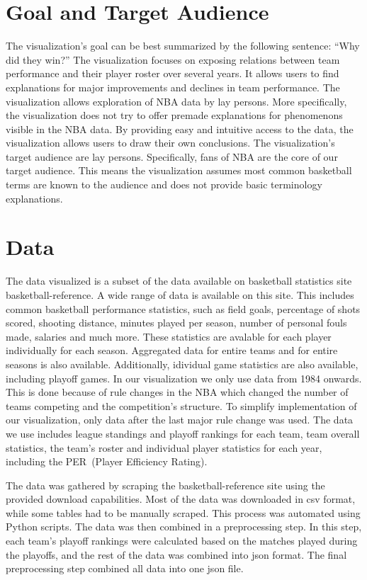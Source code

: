 \documentclass{sigchi}
\begin{document}
\section{Goal and Target Audience}\label{sec:goal} 
The visualization's goal can be best summarized by the following sentence: ``Why
did they win?'' The visualization focuses on exposing relations between team
performance and their player roster over several years. It allows users to find
explanations for major improvements and declines in team performance.  The
visualization allows exploration of NBA data by lay persons.  More specifically,
the visualization does not try to offer premade explanations for phenomenons
visible in the NBA data. By providing easy and intuitive access to the data, the
visualization allows users to draw their own conclusions. The visualization's
target audience are lay persons. Specifically, fans of NBA are the core of our
target audience. This means the visualization assumes most common basketball
terms are known to the audience and does not provide basic terminology
explanations. 

\section{Data}\label{sec:data}
The data visualized is a subset of the data available on basketball statistics
site basketball-reference\cite{basketball-reference}. A wide range of data is
available on this site. This includes common basketball performance statistics,
such as field goals, percentage of shots scored, shooting distance, minutes
played per season, number of personal fouls made, salaries and much more. These
statistics are avalable for each player individually for each season. Aggregated
data for entire teams and for entire seasons is also available. Additionally,
idividual game statistics are also available, including playoff games.  In our
visualization we only use data from 1984 onwards. This is done because of rule
changes in the NBA which changed the number of teams competing and the
competition's structure. To simplify implementation of our visualization, only
data after the last major rule change was used.  The data we use includes league
standings and playoff rankings for each team, team overall statistics, the
team's roster and individual player statistics for each year, including the
PER~(Player Efficiency Rating)\cite{per}. 

The data was gathered by scraping the basketball-reference site using the
provided download capabilities. Most of the data was downloaded in csv format,
while some tables had to be manually scraped. This process was automated using
Python scripts. The data was then combined in a preprocessing step. In this
step, each team's playoff rankings were calculated based on the matches played
during the playoffs, and the rest of the data was combined into json format. The
final preprocessing step combined all data into one json file.
\end{document}
